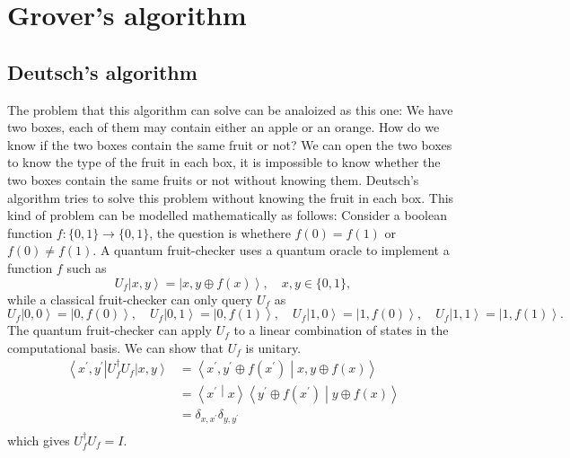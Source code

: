 \documentclass[11pt]{article}
\newcommand{\braket}[2]{\left \langle #1 \middle| #2 \right \rangle}
\newcommand{\bra}[1]{\left\langle #1\right|}
\newcommand{\ket}[1]{\left|#1\right\rangle}
\begin{document}
\section{Grover's algorithm}
\subsection{Deutsch's algorithm}
The problem that this algorithm can solve can be analoized as this one: We have two boxes, each of them may contain either an apple or an orange. How do we know
if the two boxes contain the same fruit or not? We can open the two boxes to know the type of the fruit in each box, it is impossible to know whether the two boxes contain
the same fruits or not without knowing them. Deutsch's algorithm tries to solve this problem without knowing the fruit in each box. This kind of problem can be modelled mathematically as follows: Consider
a boolean function $f:\{0,1\} \rightarrow \{0,1\}$, the question is whethere $f(0) = f(1)$ or $f(0) \neq f(1)$. A quantum fruit-checker uses a quantum oracle to implement a function $f$ such as 
\begin{equation}
    U_f\ket{x,y} = \ket{x,y\oplus f(x)}, \quad x,y \in \{0,1\},
    \end{equation}
    while a classical fruit-checker can only query $U_f$ as 
    \begin{equation}
        U_f\ket{0,0} = \ket{0,f(0)}, \quad U_f\ket{0,1} = \ket{0,f(1)}, \quad U_f\ket{1,0} = \ket{1,f(0)}, \quad U_f\ket{1,1} = \ket{1,f(1)}.
    \end{equation}
The quantum fruit-checker can apply $U_f$ to a linear combination of states in the computational basis. We can show that $U_f$ is unitary.
\begin{equation} \label{eq1}
    \begin{split}
    \bra{x^{'},y^{'}}U^\dagger_f{U_f\ket{x,y}} & = \braket{x^{'},y^{'}\oplus f(x^{'})}{x,y\oplus f(x)} \\
     & = \braket{x^{'}}{x}\braket{y^{'}\oplus f(x^{'})}{y\oplus f(x)} \\
     & = \delta_{x,x^{'}}\delta_{y,y^{'}} \\
    \end{split}
    \end{equation}
which gives $U^\dagger_fU_f = I$.
\end{document}
